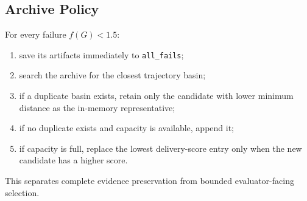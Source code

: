 \documentclass[11pt,a4paper]{report}
\newcommand{\code}[1]{\texttt{#1}}
\begin{document}
\subsection{Archive Policy}
For every failure $f(G)<1.5$:
\begin{enumerate}
  \item save its artifacts immediately to \code{all\_fails};
  \item search the archive for the closest trajectory basin;
  \item if a duplicate basin exists, retain only the candidate with lower minimum distance as the in-memory representative;
  \item if no duplicate exists and capacity is available, append it;
  \item if capacity is full, replace the lowest delivery-score entry only when the new candidate has a higher score.
\end{enumerate}

This separates complete evidence preservation from bounded evaluator-facing selection.
\end{document}
